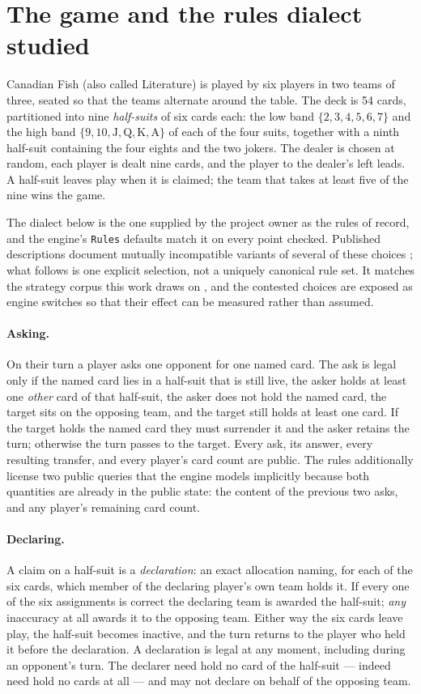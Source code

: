 \section{The game and the rules dialect studied}
\label{sec:rules}

Canadian Fish (also called Literature) is played by six players in two teams of
three, seated so that the teams alternate around the table. The deck is 54 cards,
partitioned into nine \emph{half-suits} of six cards each: the low band
$\{2,3,4,5,6,7\}$ and the high band
$\{9,10,\mathrm{J},\mathrm{Q},\mathrm{K},\mathrm{A}\}$ of each of the four suits,
together with a ninth half-suit containing the four eights and the two jokers.
The dealer is chosen at random, each player is dealt nine cards, and the player
to the dealer's left leads. A half-suit leaves play when it is claimed; the team
that takes at least five of the nine wins the game.

The dialect below is the one supplied by the project owner as the rules of
record, and the engine's \texttt{Rules} defaults match it on every point checked.
Published descriptions document mutually incompatible variants of several of
these choices \cite{pagat}; what follows is one explicit selection, not a
uniquely canonical rule set. It matches the strategy corpus this work draws on
\cite{develin}, and the contested choices are exposed as engine switches so that
their effect can be measured rather than assumed.

\paragraph{Asking.} On their turn a player asks one opponent for one named card.
The ask is legal only if the named card lies in a half-suit that is still live,
the asker holds at least one \emph{other} card of that half-suit, the asker does
not hold the named card, the target sits on the opposing team, and the target
still holds at least one card. If the target holds the named card they must
surrender it and the asker retains the turn; otherwise the turn passes to the
target. Every ask, its answer, every resulting transfer, and every player's card
count are public. The rules additionally license two public queries that the
engine models implicitly because both quantities are already in the public state:
the content of the previous two asks, and any player's remaining card count.

\paragraph{Declaring.} A claim on a half-suit is a \emph{declaration}: an exact
allocation naming, for each of the six cards, which member of the declaring
player's own team holds it. If every one of the six assignments is correct the
declaring team is awarded the half-suit; \emph{any} inaccuracy at all awards it
to the opposing team. Either way the six cards leave play, the half-suit becomes
inactive, and the turn returns to the player who held it before the declaration.
A declaration is legal at any moment, including during an opponent's turn. The
declarer need hold no card of the half-suit --- indeed need hold no cards at all
--- and may not declare on behalf of the opposing team.

